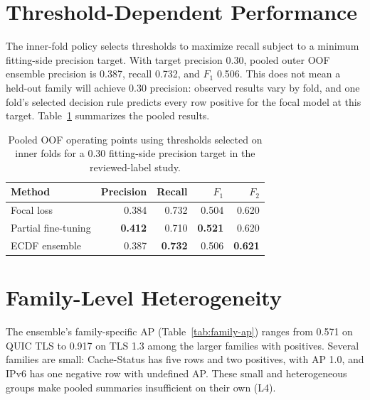 \documentclass[12pt,a4paper,oneside]{report}
\begin{document}
\section{Threshold-Dependent Performance}

The inner-fold policy selects thresholds to maximize recall subject to a minimum fitting-side precision target. With target precision 0.30, pooled outer OOF ensemble precision is 0.387, recall 0.732, and $F_1$ 0.506.
This does not mean a held-out family will achieve 0.30 precision: observed results vary by fold, and one fold's selected decision rule predicts every row positive for the focal model at this target. Table~\ref{tab:thresholds} summarizes the pooled results.

\begin{table}[!tbp]
\caption{Pooled OOF operating points using thresholds selected on inner folds for a 0.30 fitting-side precision target in the reviewed-label study.}
\label{tab:thresholds}
\centering
\begin{tabular}{lrrrr}
\toprule
Method & Precision & Recall & $F_1$ & $F_2$ \\
\midrule
Focal loss & 0.384 & 0.732 & 0.504 & 0.620 \\
Partial fine-tuning & \textbf{0.412} & 0.710 & \textbf{0.521} & 0.620 \\
ECDF ensemble & 0.387 & \textbf{0.732} & 0.506 & \textbf{0.621} \\
\bottomrule
\end{tabular}
\end{table}

\section{Family-Level Heterogeneity}

The ensemble's family-specific AP (Table~\ref{tab:family-ap}) ranges from 0.571 on QUIC TLS to 0.917 on TLS 1.3 among the larger families with positives. Several families are small: Cache-Status has five rows and two positives, with AP 1.0, and IPv6 has one negative row with undefined AP. These small and heterogeneous groups make pooled summaries insufficient on their own (L4).
\end{document}
